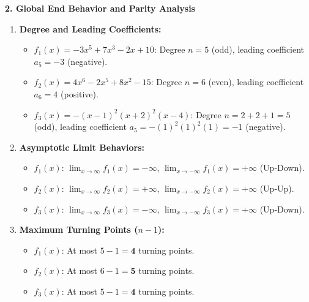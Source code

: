 \textbf{2. Global End Behavior and Parity Analysis}
\begin{enumerate}
    \item \textbf{Degree and Leading Coefficients:}
    \begin{itemize}
        \item $f_1(x) = -3x^5 + 7x^3 - 2x + 10$: Degree $n = 5$ (odd), leading coefficient $a_5 = -3$ (negative).
        \item $f_2(x) = 4x^6 - 2x^5 + 8x^2 - 15$: Degree $n = 6$ (even), leading coefficient $a_6 = 4$ (positive).
        \item $f_3(x) = -(x - 1)^2 (x + 2)^2 (x - 4)$: Degree $n = 2 + 2 + 1 = 5$ (odd), leading coefficient $a_5 = -(1)^2(1)^2(1) = -1$ (negative).
    \end{itemize}
    \item \textbf{Asymptotic Limit Behaviors:}
    \begin{itemize}
        \item $f_1(x)$: $\lim_{x \to \infty} f_1(x) = \mathbf{-\infty}$, $\lim_{x \to -\infty} f_1(x) = \mathbf{+\infty}$ (Up-Down).
        \item $f_2(x)$: $\lim_{x \to \infty} f_2(x) = \mathbf{+\infty}$, $\lim_{x \to -\infty} f_2(x) = \mathbf{+\infty}$ (Up-Up).
        \item $f_3(x)$: $\lim_{x \to \infty} f_3(x) = \mathbf{-\infty}$, $\lim_{x \to -\infty} f_3(x) = \mathbf{+\infty}$ (Up-Down).
    \end{itemize}
    \item \textbf{Maximum Turning Points ($n - 1$):}
    \begin{itemize}
        \item $f_1(x)$: At most $5 - 1 = \mathbf{4}$ turning points.
        \item $f_2(x)$: At most $6 - 1 = \mathbf{5}$ turning points.
        \item $f_3(x)$: At most $5 - 1 = \mathbf{4}$ turning points.
    \end{itemize}
\end{enumerate}

